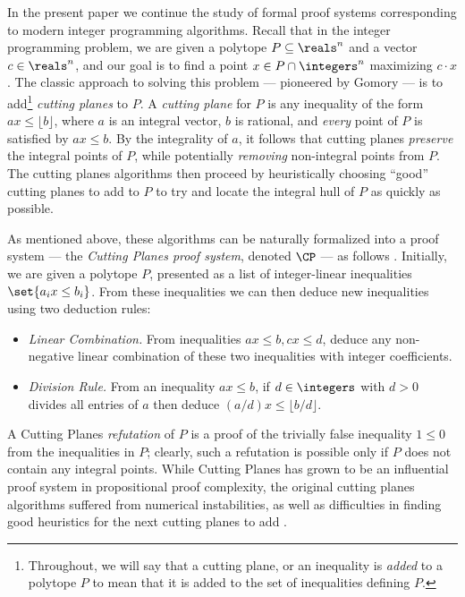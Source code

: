 \documentclass[11pt]{article}
\begin{document}
In the present %
paper   %
we continue the study of formal proof systems corresponding to modern integer programming algorithms.
Recall that in the integer programming problem, we are given a polytope $P \subseteq \reals^n$ and a vector $c \in \reals^n$, and our goal is to find a point $x \in P \cap \integers^n$ maximizing $c \cdot x$.
The classic approach to solving this problem --- pioneered by Gomory \cite{gomory1963algorithm} --- is to add\footnote{Throughout, we will say that a cutting plane, or an inequality is \emph{added} to a polytope $P$ to mean that it is added to the set of inequalities defining $P$.} \emph{cutting planes} to  $P$.
A \emph{cutting plane} for $P$ is any inequality of the form $ax \leq \lfloor b \rfloor$, where $a$ is an integral vector, $b$ is rational, and \emph{every} point of $P$ is satisfied by $ax \leq b$.
By the integrality of $a$, it follows that cutting planes \emph{preserve} the integral points of $P$, while potentially \emph{removing} non-integral points from $P$.
The cutting planes algorithms then proceed by heuristically choosing ``good'' cutting planes to add to $P$ to try and locate the integral hull of $P$ as quickly as possible.

As mentioned above, these algorithms can be naturally formalized into a proof system --- the \emph{Cutting Planes proof system}, denoted $\CP$ --- as follows \cite{Chvatal73a}.
Initially, we are given a polytope $P$, presented as a list of integer-linear inequalities $\set{a_i x \leq b_i}$.
From these inequalities we can then deduce new inequalities using two deduction rules:
\begin{itemize}
	\item \emph{Linear Combination.} From inequalities $ax \leq b, cx \leq d$, deduce any non-negative linear combination of these two inequalities with integer coefficients.
	\item \emph{Division Rule.} From an inequality $ax \leq b$, if $d \in \integers$ with $d > 0$ divides all entries of $a$ then deduce $(a/d)x \leq \lfloor b/d \rfloor$.
\end{itemize}
A Cutting Planes \emph{refutation} of $P$ is a proof of the trivially false inequality $1 \leq 0$ from the inequalities in $P$; clearly, such a refutation is possible only if $P$ does not contain any integral points.
While Cutting Planes has grown to be an influential proof system in propositional proof complexity, the original cutting planes algorithms suffered from numerical instabilities, as well as difficulties in finding good heuristics for the next cutting planes to add \cite{gomory1963algorithm}.
\end{document}
